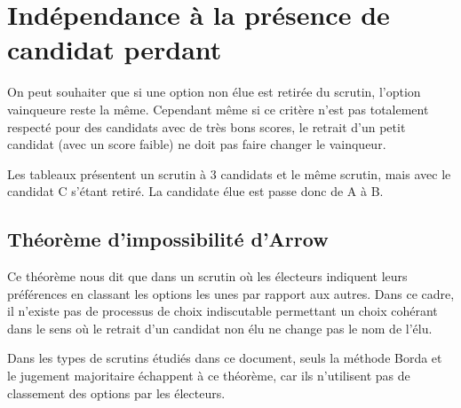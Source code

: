 \documentclass[../report]{subfiles}
\begin{document}
  \section{Indépendance à la présence de candidat perdant}

  On peut souhaiter que si une option non élue est retirée du scrutin, l'option vainqueure reste
  la même.
  Cependant même si ce critère n'est pas totalement respecté pour des candidats avec de très bons 
  scores, le retrait d'un petit candidat (avec un score faible) ne doit pas faire changer 
  le vainqueur.
  
  Les tableaux  présentent un scrutin à 3 candidats et le même 
  scrutin, mais avec le candidat C s'étant retiré. La candidate élue est passe donc de A à B.

  \subsection{Théorème d'impossibilité d'Arrow}

  Ce théorème nous dit que dans un scrutin où les électeurs indiquent leurs préférences en classant les
  options les unes par rapport aux autres.
  Dans ce cadre, il n'existe pas de processus de choix indiscutable permettant un choix 
  cohérant dans le sens où le retrait d'un candidat non élu ne change pas le nom de l'élu.

  Dans les types de scrutins étudiés dans ce document, seuls la méthode Borda et le 
  jugement majoritaire échappent à ce théorème, car ils n'utilisent pas de classement des 
  options par les électeurs.
  
\end{document}
